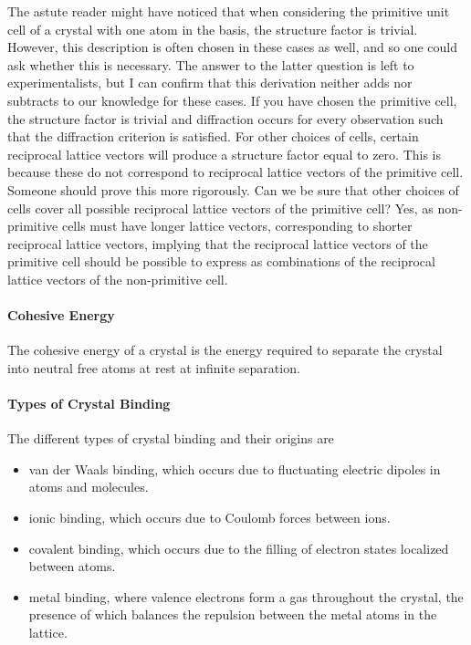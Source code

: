 The astute reader might have noticed that when considering the primitive unit cell of a crystal with one atom in the basis, the structure factor is trivial. However, this description is often chosen in these cases as well, and so one could ask whether this is necessary. The answer to the latter question is left to experimentalists, but I can confirm that this derivation neither adds nor subtracts to our knowledge for these cases. If you have chosen the primitive cell, the structure factor is trivial and diffraction occurs for every observation such that the diffraction criterion is satisfied. For other choices of cells, certain reciprocal lattice vectors will produce a structure factor equal to zero. This is because these do not correspond to reciprocal lattice vectors of the primitive cell. Someone should prove this more rigorously. Can we be sure that other choices of cells cover all possible reciprocal lattice vectors of the primitive cell? Yes, as non-primitive cells must have longer lattice vectors, corresponding to shorter reciprocal lattice vectors, implying that the reciprocal lattice vectors of the primitive cell should be possible to express as combinations of the reciprocal lattice vectors of the non-primitive cell.

\paragraph{Cohesive Energy}
The cohesive energy of a crystal is the energy required to separate the crystal into neutral free atoms at rest at infinite separation.

\paragraph{Types of Crystal Binding}
The different types of crystal binding and their origins are
\begin{itemize}
	\item van der Waals binding, which occurs due to fluctuating electric dipoles in atoms and molecules.
	\item ionic binding, which occurs due to Coulomb forces between ions.
	\item covalent binding, which occurs due to the filling of electron states localized between atoms.
	\item metal binding, where valence electrons form a gas throughout the crystal, the presence of which balances the repulsion between the metal atoms in the lattice.
\end{itemize}


